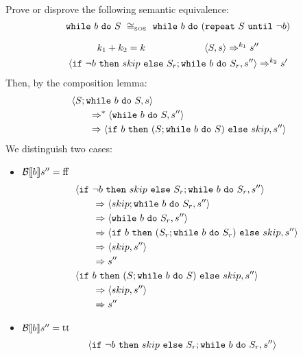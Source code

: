 \begin{exercise}{
    Prove or disprove the following semantic equivalence:
    \[ \wwhile{b}{S}\ \cong_{\text{\tiny SOS}}\ \wwhile{b}{(\wrepeat{S}{\neg b})}  \]
}
\begin{itemize}
\begin{itemize}
\begin{itemize}
\begin{gather*}
                            k_1 + k_2 = k \qquad\qquad\qquad \left<S, s\right> \Rightarrow^{k_1} s'' \\
                            \left<\texttt{if}\ \neg b\ \texttt{then}\ skip\ \texttt{else}\ S_r; \texttt{while}\ b\ \texttt{do}\ S_r, s''\right> \Rightarrow^{k_2} s'
                        \end{gather*}
                        Then, by the composition lemma:
                        \begin{align*}
                            &\left<S; \texttt{while}\ b\ \texttt{do}\ S, s\right>
                            \\&\qquad\Rightarrow^* \left<\texttt{while}\ b\ \texttt{do}\ S, s''\right>
                            \\&\qquad\Rightarrow \left<\texttt{if}\ b\ \texttt{then}\ (S; \texttt{while}\ b\ \texttt{do}\ S)\ \texttt{else}\ skip, s''\right>
                        \end{align*}
                        We distinguish two cases:
                        \begin{itemize}
                            \item $\mathcal{B} \llbracket b \rrbracket s'' = \text{ff}$
                                \begin{align*}
                                    &\left<\texttt{if}\ \neg b\ \texttt{then}\ skip\ \texttt{else}\ S_r; \texttt{while}\ b\ \texttt{do}\ S_r, s''\right>
                                    \\&\qquad\Rightarrow \left<skip; \texttt{while}\ b\ \texttt{do}\ S_r, s''\right>
                                    \\&\qquad\Rightarrow \left<\texttt{while}\ b\ \texttt{do}\ S_r, s''\right>
                                    \\&\qquad\Rightarrow \left<\texttt{if}\ b\ \texttt{then}\ (S_r; \texttt{while}\ b\ \texttt{do}\ S_r)\ \texttt{else}\ skip, s''\right>
                                    \\&\qquad\Rightarrow \left<skip, s''\right>
                                    \\&\qquad\Rightarrow s''
                                    \\
                                    &\left<\texttt{if}\ b\ \texttt{then}\ (S; \texttt{while}\ b\ \texttt{do}\ S)\ \texttt{else}\ skip, s''\right>
                                    \\&\qquad\Rightarrow \left<skip, s''\right>
                                    \\&\qquad\Rightarrow s''
                                \end{align*}
                            \item $\mathcal{B} \llbracket b \rrbracket s'' = \text{tt}$
                                \begin{align*}
                                    &\instr{\wif{\neg b}{skip}{S_r}; \wwhile{b}{S_r}}{s''}

\end{align*}
\end{itemize}
\end{itemize}
\end{itemize}
\end{itemize}
\end{exercise}
